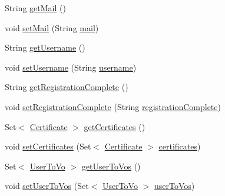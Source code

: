 \begin{DoxyCompactItemize}
\item 
String \hyperlink{classportal_1_1registration_1_1domain_1_1UserInfo_ab6dea2bfa58260b955cd40c7990f6755}{getMail} ()
\item 
void \hyperlink{classportal_1_1registration_1_1domain_1_1UserInfo_acdda421b0770953b2e37fa17651b4287}{setMail} (String \hyperlink{classportal_1_1registration_1_1domain_1_1UserInfo_a0433a86cea33aac5e724356012617157}{mail})
\item 
String \hyperlink{classportal_1_1registration_1_1domain_1_1UserInfo_a929f371c5886ad09e6d4c068490d5299}{getUsername} ()
\item 
void \hyperlink{classportal_1_1registration_1_1domain_1_1UserInfo_afc1777958910500eab3a8b604c3a9f57}{setUsername} (String \hyperlink{classportal_1_1registration_1_1domain_1_1UserInfo_ac3583a042c907bcce6ee84d3b2ee637d}{username})
\item 
String \hyperlink{classportal_1_1registration_1_1domain_1_1UserInfo_aa7222bfbc7d52de11f68a83cab308885}{getRegistrationComplete} ()
\item 
void \hyperlink{classportal_1_1registration_1_1domain_1_1UserInfo_a0faf57dfd8593ff7fd523793bc20d5a1}{setRegistrationComplete} (String \hyperlink{classportal_1_1registration_1_1domain_1_1UserInfo_ab5145405b331d11672cd66053ceb012c}{registrationComplete})
\item 
Set$<$ \hyperlink{classportal_1_1registration_1_1domain_1_1Certificate}{Certificate} $>$ \hyperlink{classportal_1_1registration_1_1domain_1_1UserInfo_af15ae00df478bb8a72b56dcb8fd808e0}{getCertificates} ()
\item 
void \hyperlink{classportal_1_1registration_1_1domain_1_1UserInfo_a8d01ab50b64992c36920e567fae78253}{setCertificates} (Set$<$ \hyperlink{classportal_1_1registration_1_1domain_1_1Certificate}{Certificate} $>$ \hyperlink{classportal_1_1registration_1_1domain_1_1UserInfo_a5923ed9351bde36f580647933f7b3fe0}{certificates})
\item 
Set$<$ \hyperlink{classportal_1_1registration_1_1domain_1_1UserToVo}{UserToVo} $>$ \hyperlink{classportal_1_1registration_1_1domain_1_1UserInfo_a43782780c57a4a97e8d3261424a8041e}{getUserToVos} ()
\item 
void \hyperlink{classportal_1_1registration_1_1domain_1_1UserInfo_a7f6eaaa74e90c6b184238762e93547d2}{setUserToVos} (Set$<$ \hyperlink{classportal_1_1registration_1_1domain_1_1UserToVo}{UserToVo} $>$ \hyperlink{classportal_1_1registration_1_1domain_1_1UserInfo_a334522ed169ed1e54ac676a31b0cc701}{userToVos})
\end{DoxyCompactItemize}

